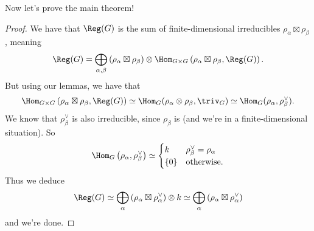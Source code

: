 Now let's prove the main theorem!

\begin{proof}
	We have that $\Reg(G)$ is the sum of finite-dimensional irreducibles $\rho_\alpha \boxtimes \rho_\beta$, meaning
	\[ 
		\Reg(G) =
		\bigoplus_{\alpha, \beta}
		\left( \rho_\alpha \boxtimes \rho_\beta \right)
		\otimes
		\Hom_{G \times G}\left( \rho_\alpha \boxtimes \rho_\beta, \Reg(G) \right).
	\]
	But using our lemmas, we have that
	\[
		\Hom_{G \times G}\left( \rho_\alpha \boxtimes \rho_\beta, \Reg(G) \right)
		\simeq
		\Hom_G(\rho_\alpha \otimes \rho_\beta, \triv_G)
		\simeq \Hom_G(\rho_\alpha, \rho_\beta^\vee).
	\]
	We know that $\rho_\beta^\vee$ is also irreducible, since $\rho_\beta$ is (and we're in a finite-dimensional situation).
	So
	\[
		\Hom_G\left( \rho_\alpha, \rho_\beta^\vee \right)
		\simeq
		\begin{cases}
			k & \rho_\beta^\vee = \rho_\alpha \\
			\{0\} & \text{otherwise}.
		\end{cases}
	\]
	Thus we deduce
	\[ \Reg(G)
		\simeq \bigoplus_{\alpha}
		\left( \rho_\alpha \boxtimes \rho_\alpha^\vee \right)
		\otimes k
		\simeq \bigoplus_{\alpha}
		\left( \rho_\alpha \boxtimes \rho_\alpha^\vee \right)
	\]
	and we're done.
\end{proof}

